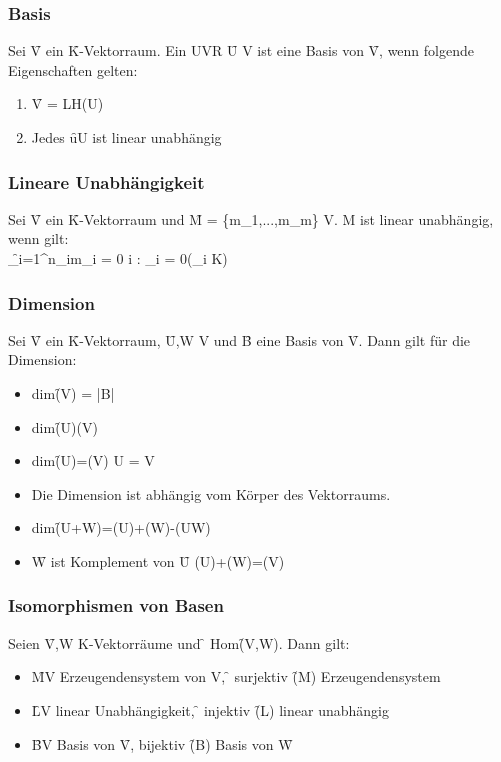 \subsubsection*{Basis}
Sei \f{V} ein \f{K}-Vektorraum. Ein UVR \f{U \subseteq  V} ist eine Basis von \f{V}, wenn folgende Eigenschaften gelten:
\begin{enumerate}
    \item \f{V = LH(U)}
    \item Jedes \f{u\in U} ist linear unabhängig
\end{enumerate}
\subsubsection*{Lineare Unabhängigkeit}
Sei \f{V} ein \f{K}-Vektorraum und \f{M = \left\{m_1,...,m_m\right\} \subseteq  V}. M ist linear unabhängig, wenn gilt:\\
\f{\sum_{i=1}^{n}\lambda_im_i = 0 \Leftrightarrow \forall i : \lambda_i = 0\quad (\lambda_i \in K)}
\subsubsection*{Dimension}
Sei \f{V} ein \f{K}-Vektorraum, \f{U,W \subseteq V} und \f{B} eine Basis von \f{V}. Dann gilt für die Dimension:
\begin{itemize}
    \item dim\f{(V) = |B|}
    \item dim\f{(U)\leq{}(V)}
    \item dim\f{(U)=(V) \Leftrightarrow U = V}
    \item Die Dimension ist abhängig vom Körper des Vektorraums.
    \item dim\f{(U+W)=(U)+(W)-(U\cap W)}
    \item \f{W} ist Komplement von \f{U \Leftrightarrow {}(U)+(W)=(V)}
\end{itemize}
\subsubsection*{Isomorphismen von Basen}
Seien \f{V,W K}-Vektorräume und \f{\Phi \in} Hom\f{(V,W)}. Dann gilt:
\begin{itemize}
    \item \f{M\subseteq V} Erzeugendensystem von V, \f{\Phi} surjektiv \f{\Rightarrow \Phi(M)} Erzeugendensystem
    \item \f{L\subseteq V} linear Unabhängigkeit, \f{\Phi} injektiv \f{\Rightarrow \Phi(L)} linear unabhängig
    \item \f{B\subseteq V} Basis von \f{V, \Phi} bijektiv \f{\Rightarrow \Phi(B)} Basis von \f{W}
\end{itemize}

